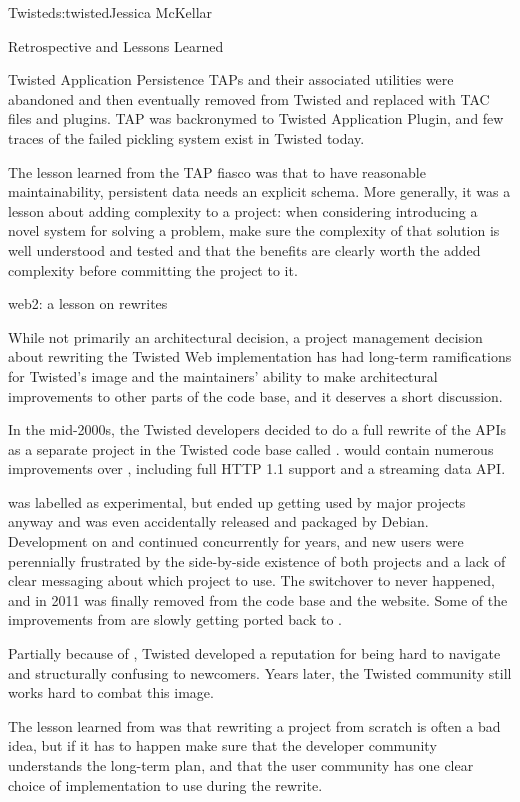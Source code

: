\begin{aosachapter}{Twisted}{s:twisted}{Jessica McKellar}
\begin{aosasect1}{Retrospective and Lessons Learned}
\begin{aosasect2}{Twisted Application Persistence}
TAPs and their associated utilities were abandoned and then eventually
removed from Twisted and replaced with TAC files and plugins. TAP was
backronymed to Twisted Application Plugin, and few traces of the failed pickling
system exist in Twisted today.

The lesson learned from the TAP fiasco was that to have reasonable
maintainability, persistent data needs an explicit schema. More generally, it
was a lesson about adding complexity to a project: when considering introducing
a novel system for solving a problem, make sure the complexity of that solution
is well understood and tested and that the benefits are clearly worth the added
complexity before committing the project to it.

\end{aosasect2}

\begin{aosasect2}{web2: a lesson on rewrites}

While not primarily an architectural decision, a project management decision
about rewriting the Twisted Web implementation has had long-term ramifications
for Twisted's image and the maintainers' ability to make architectural
improvements to other parts of the code base, and it deserves a short
discussion.

In the mid-2000s, the Twisted developers decided to do a full rewrite of the
 APIs as a separate project in the Twisted code base
called .  would contain numerous improvements
over , including full HTTP 1.1 support and a streaming
data API.

 was labelled as experimental, but ended up getting used by
major projects anyway and was even accidentally released and packaged by
Debian. Development on  and  continued
concurrently for years, and new users were perennially frustrated by the
side-by-side existence of both projects and a lack of clear messaging about
which project to use. The switchover to  never happened, and in
2011  was finally removed from the code base and the
website. Some of the improvements from  are slowly getting
ported back to .

Partially because of , Twisted developed a reputation for
being hard to navigate and structurally confusing to newcomers. Years later, the
Twisted community still works hard to combat this image.

The lesson learned from  was that rewriting a project from
scratch is often a bad idea, but if it has to happen make sure that the
developer community understands the long-term plan, and that the user community
has one clear choice of implementation to use during the rewrite.


\end{aosasect2}
\end{aosasect1}
\end{aosachapter}
